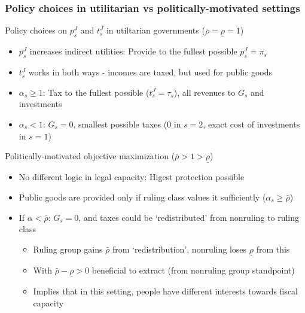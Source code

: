 \documentclass[aspectratio=169]{beamer}
\begin{document}
\begin{frame}
\frametitle{Policy choices in utilitarian vs politically-motivated settings} 
Policy choices on $p_s^J$ and $t_s^J$ in utiltarian governments ($\bar{\rho}=\underline{\rho}=1$)
\begin{itemize}\setlength\itemsep{3pt}
\item $p_s^J$ increases indirect utilities: Provide to the fullest possible $p_s^J=\pi_s$ 
\item $t_s^J$ works in both ways - incomes are taxed, but used for public goods
\item $\alpha_s\geq1$: Tax to the fullest possible ($t_s^J=\tau_s$), all revenues to $G_s$ and investments 
\item $\alpha_s<1$: $G_s=0$, smallest possible taxes (0 in $s=2$, exact cost of investments in $s=1$)
\end{itemize}\medskip
Politically-motivated objective maximization ($\bar{\rho}>1>\underline{\rho}$)
\begin{itemize}\setlength\itemsep{3pt}
\item No different logic in legal capacity: Higest protection possible
\item Public goods are provided only if ruling class values it sufficiently ($\alpha_s\geq\bar{\rho}$)
\item If $\alpha<\bar{\rho}$:  $G_s=0$, and taxes could be `redistributed' from nonruling to ruling class
\begin{itemize}
  \item Ruling group gains $\bar{\rho}$ from `redistribution', nonruling loses $\underline{\rho}$ from this
  \item With $\bar{\rho}-\underline{\rho}>0$ beneficial to extract (from nonruling group standpoint)
\item Implies that in this setting, people have different interests towards fiscal capacity
\end{itemize}
\end{itemize}
\end{frame}
\end{document}
